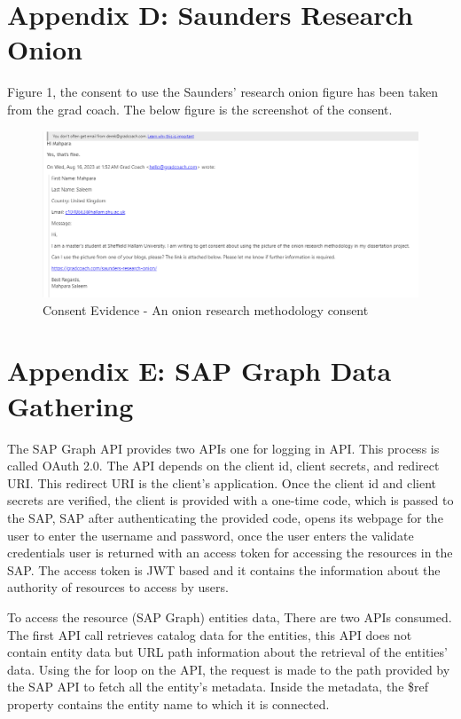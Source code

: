 \documentclass{article}
\begin{document}
\newpage

\section{Appendix D: Saunders Research Onion}
Figure 1, the consent to use the Saunders' research onion figure has been taken from the grad coach. The below figure is the screenshot of the consent.

\begin{figure}[ht!]
    \centering
    \includegraphics[scale=0.3]{onion-ring-consent}
    \caption{Consent Evidence  - 
An onion research methodology consent }
    \label{fig:onion-research-consent}
\end{figure}

\newpage

\section{Appendix E: SAP Graph Data Gathering}
The SAP Graph API provides two APIs one for logging in API. This process is called OAuth 2.0. The API depends on the client id, client secrets, and redirect URI. This redirect URI is the client's application. Once the client id and client secrets are verified, the client is provided with a one-time code, which is passed to the SAP, SAP after authenticating the provided code, opens its webpage for the user to enter the username and password, once the user enters the validate credentials user is returned with an access token for accessing the resources in the SAP. The access token is JWT based and it contains the information about the authority of resources to access by users. 

To access the resource (SAP Graph) entities data, There are two APIs consumed. The first API call retrieves catalog data for the entities, this API does not contain entity data but URL path information about the retrieval of the entities' data. Using the for loop on the API, the request is made to the path provided by the SAP API to fetch all the entity's metadata. Inside the metadata, the \$ref property contains the entity name to which it is connected. 
\end{document}
